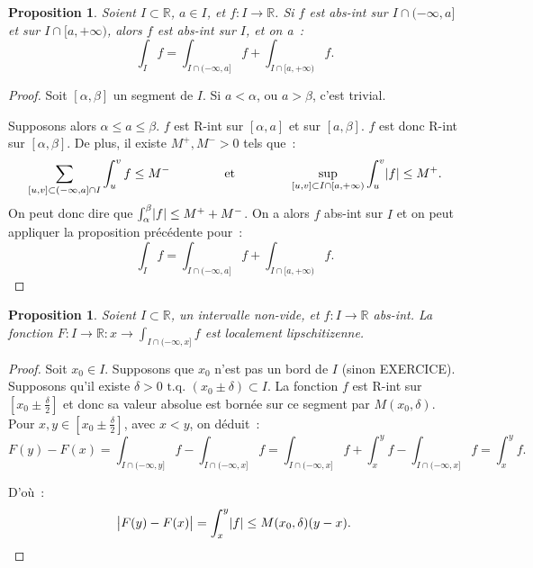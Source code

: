 \documentclass{report}
\newtheorem{prp}[thm]{Proposition}
\theoremstyle{definition}
\theoremstyle{remark}
\numberwithin{equation}{section}
\newcommand{\R}{\mathbb R}
\newcommand{\tq}{\text{ t.q. }}
\newcommand{\minfty}{{-\infty}}
\newcommand{\pinfty}{{+\infty}}
\begin{document}
			\begin{prp} Soient $I \subset \R$, $a \in I$, et $f : I \to \R$. Si $f$ est abs-int sur $I \cap (\minfty, a]$ et sur $I \cap [a, \pinfty)$, alors $f$
			est abs-int sur $I$, et on a~:
			\begin{equation}
				\int_I f = \int_{I \cap (\minfty, a]} f + \int_{I \cap [a, \pinfty)} f.
			\end{equation}
			\end{prp}

			\begin{proof} Soit $[\alpha, \beta]$ un segment de $I$. Si $a < \alpha$, ou $a > \beta$, c'est trivial.

			Supposons alors $\alpha \leq a \leq \beta$. $f$ est R-int sur $[\alpha, a]$ et sur $[a, \beta]$. $f$ est donc R-int sur $[\alpha, \beta]$. De plus, il existe
			$M^+, M^- > 0$ tels que~:
			\begin{equation}
				\sum_{[u, v] \subset (\minfty, a] \cap I}\int_u^v f \leq M^-\qquad\qquad\text{ et }\qquad\qquad\sup_{[u, v] \subset I \cap [a, \pinfty)}\int_u^v\abs f
				\leq M^+.
			\end{equation}
			On peut donc dire que $\int_\alpha^\beta\abs f \leq M^+ + M^-$. On a alors $f$ abs-int sur $I$ et on peut appliquer la proposition précédente pour~:
			\begin{equation}
				\int_I f = \int_{I \cap (\minfty, a]} f + \int_{I \cap [a, \pinfty)} f.
			\end{equation}
			\end{proof}

			\begin{prp} Soient $I \subset \R$, un intervalle non-vide, et $f : I \to \R$ abs-int. La fonction $F : I \to \R : x \to \int_{I \cap (\minfty, x]} f$ est
			localement lipschitizenne.
			\end{prp}

			\begin{proof} Soit $x_0 \in I$. Supposons que $x_0$ n'est pas un bord de $I$ (sinon EXERCICE). Supposons qu'il existe
			$\delta > 0 \tq (x_0 \pm \delta) \subset I$. La fonction $f$ est R-int sur $\left[x_0 \pm \frac \delta2\right]$ et donc sa valeur absolue est bornée sur
			ce segment par $M(x_0, \delta)$. Pour $x, y \in \left[x_0 \pm \frac \delta2\right]$, avec $x < y$, on déduit~:
			\begin{equation}
				F(y) - F(x) = \int_{I \cap (\minfty, y]} f - \int_{I \cap (-\infty, x]} f
				= \int_{I \cap (\minfty, x]} f + \int_x^y f - \int_{I \cap (\minfty, x]} f = \int_x^y f.
			\end{equation}

			D'où~:
			\begin{equation}
				\abs {F(y) - F(x)} = \int_x^y\abs f \leq M(x_0, \delta)(y-x).
			\end{equation}
			\end{proof}
\end{document}
